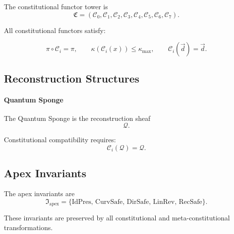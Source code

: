The constitutional functor tower is
\[
\mathfrak{C} =
(\mathcal{C}_0, \mathcal{C}_1, \mathcal{C}_2,
 \mathcal{C}_3, \mathcal{C}_4,
 \mathcal{C}_5, \mathcal{C}_6, \mathcal{C}_7).
\]

All constitutional functors satisfy:

\[
\pi \circ \mathcal{C}_i = \pi,
\qquad
\kappa(\mathcal{C}_i(x)) \le \kappa_{\max},
\qquad
\mathcal{C}_i(\vec{d}) = \vec{d}.
\]


\subsection{Reconstruction Structures}

\paragraph{Quantum Sponge}
The Quantum Sponge is the reconstruction sheaf
\[
\mathcal{Q}.
\]

Constitutional compatibility requires:
\[
\mathcal{C}_i(\mathcal{Q}) = \mathcal{Q}.
\]


\subsection{Apex Invariants}

The apex invariants are
\[
\mathfrak{I}_{\mathrm{apex}}
=
\{\mathrm{IdPres},\,
  \mathrm{CurvSafe},\,
  \mathrm{DirSafe},\,
  \mathrm{LinRev},\,
  \mathrm{RecSafe}\}.
\]

These invariants are preserved by all constitutional and meta-constitutional
transformations.

